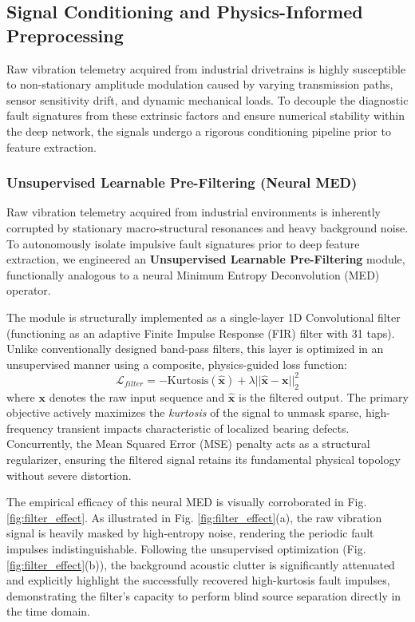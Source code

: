 \documentclass[5p,times,twocolumn]{elsarticle}
\begin{document}
\subsection{Signal Conditioning and Physics-Informed Preprocessing}
\label{subsec:preprocessing}
Raw vibration telemetry acquired from industrial drivetrains is highly susceptible to non-stationary amplitude modulation caused by varying transmission paths, sensor sensitivity drift, and dynamic mechanical loads. To decouple the diagnostic fault signatures from these extrinsic factors and ensure numerical stability within the deep network, the signals undergo a rigorous conditioning pipeline prior to feature extraction.

\subsubsection{Unsupervised Learnable Pre-Filtering (Neural MED)}
Raw vibration telemetry acquired from industrial environments is inherently corrupted by stationary macro-structural resonances and heavy background noise. To autonomously isolate impulsive fault signatures prior to deep feature extraction, we engineered an \textbf{Unsupervised Learnable Pre-Filtering} module, functionally analogous to a neural Minimum Entropy Deconvolution (MED) operator.

The module is structurally implemented as a single-layer 1D Convolutional filter (functioning as an adaptive Finite Impulse Response (FIR) filter with 31 taps). Unlike conventionally designed band-pass filters, this layer is optimized in an unsupervised manner using a composite, physics-guided loss function:
\begin{equation}
    \mathcal{L}_{filter} = -\text{Kurtosis}(\hat{\mathbf{x}}) + \lambda ||\hat{\mathbf{x}} - \mathbf{x}||_2^2
\end{equation}
where $\mathbf{x}$ denotes the raw input sequence and $\hat{\mathbf{x}}$ is the filtered output. The primary objective actively maximizes the \textit{kurtosis} of the signal to unmask sparse, high-frequency transient impacts characteristic of localized bearing defects. Concurrently, the Mean Squared Error (MSE) penalty acts as a structural regularizer, ensuring the filtered signal retains its fundamental physical topology without severe distortion.

The empirical efficacy of this neural MED is visually corroborated in Fig. \ref{fig:filter_effect}. As illustrated in Fig. \ref{fig:filter_effect}(a), the raw vibration signal is heavily masked by high-entropy noise, rendering the periodic fault impulses indistinguishable. Following the unsupervised optimization (Fig. \ref{fig:filter_effect}(b)), the background acoustic clutter is significantly attenuated and explicitly highlight the successfully recovered high-kurtosis fault impulses, demonstrating the filter's capacity to perform blind source separation directly in the time domain.
\end{document}
